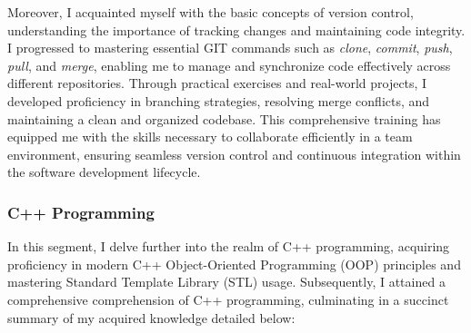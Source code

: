     \noindent Moreover, I acquainted myself with the basic concepts of version control, understanding the importance of tracking changes and maintaining code integrity. I progressed to mastering essential GIT commands such as \textit{clone}, \textit{commit}, \textit{push}, \textit{pull}, and \textit{merge}, enabling me to manage and synchronize code effectively across different repositories. Through practical exercises and real-world projects, I developed proficiency in branching strategies, resolving merge conflicts, and maintaining a clean and organized codebase. This comprehensive training has equipped me with the skills necessary to collaborate efficiently in a team environment, ensuring seamless version control and continuous integration within the software development lifecycle.

    \subsubsection{C++ Programming}
    In this segment, I delve further into the realm of C++ programming, acquiring proficiency in modern C++ Object-Oriented Programming (OOP) principles and mastering Standard Template Library (STL) usage. Subsequently, I attained a comprehensive comprehension of C++ programming, culminating in a succinct summary of my acquired knowledge detailed below:
    
